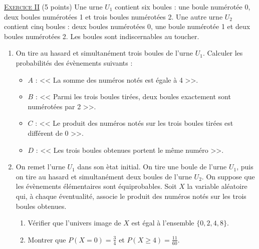 \noindent \underline{\textsc{Exercice II}} (5 points) \newline
      Une urne $U_1$ contient six boules : 
      une boule num\'erot\'ee 0, deux boules num\'erot\'ees 1 et trois boules num\'erot\'ees 2.
      Une autre urne $U_2$ contient cinq boules : 
      deux boules num\'erot\'ees 0, une boule num\'erot\'ee 1 et deux boules num\'erot\'ees 2.
      Les boules sont indiscernables au toucher.
      \begin{enumerate}
            \item On tire au hasard et simultan\'ement trois boules de l'urne $U_1$.
                  Calculer les probabilit\'es des \'ev\`enements suivants : 
                  \begin{itemize}
                        \item $A$ : << La somme des num\'eros not\'es est \'egale \`a 4 >>.
                        \item $B$ : << Parmi les trois boules tir\'ees, deux boules exactement sont num\'erot\'ees par 2 >>.
                        \item $C$ : << Le produit des num\'eros not\'es sur les trois boules tir\'ees est diff\'erent de 0 >>.
                        \item $D$ : << Les trois boules obtenues portent le m\^eme num\'ero >>.
                  \end{itemize}
            \item On remet l'urne $U_1$ dans son \`etat initial.
                  On tire une boule de l'urne $U_1$, puis on tire au hasard et simultan\'ement deux boules de l'urne $U_2$.
                  On suppose que les \'ev\`enements \'el\'ementaires sont \'equiprobables.
                  Soit $X$ la variable al\'eatoire qui, \`a chaque \'eventualit\'e, associe le produit des num\'eros
                  not\'es sur les trois boules obtenues.
                  \begin{enumerate}
                        \item V\'erifier que l'univers image de $X$ est \'egal \`a l'ensemble $\{ 0, 2, 4, 8 \}$.
                        \item Montrer que $P(X = 0) = \frac{3}{4}$ et $P(X \geq 4) = \frac{11}{60}$.

\end{enumerate}
\end{enumerate}
